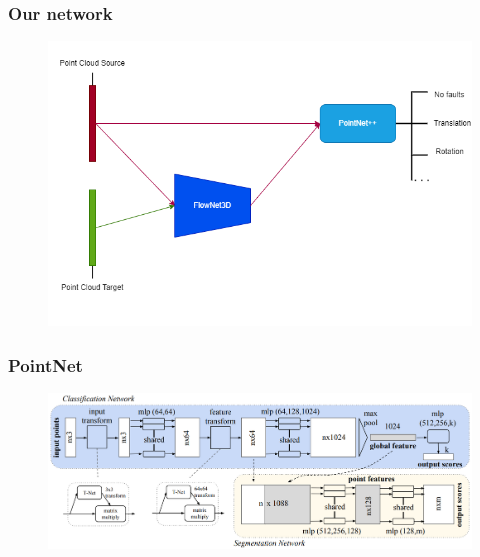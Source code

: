 \documentclass{beamer}
\begin{document}
\begin{frame}[t,allowframebreaks]
    \frametitle{Our network}
    \begin{figure}
        \centering
        \includegraphics[scale=0.35]{img/05_OurNetwork.png}
        \label{fig:enter-label}
    \end{figure}
\end{frame}
\begin{frame}[t,allowframebreaks]
    \frametitle{PointNet}
     
    \begin{figure}
        \centering
        \includegraphics[width=\textwidth,height=0.8\textheight,keepaspectratio]{img/05_Pointnet.png}
        
        \label{fig:enter-label}
    \end{figure}
\end{frame}
\end{document}
